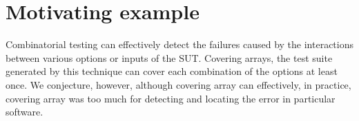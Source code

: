 \documentclass{sig-alternate}
\begin{document}
%
%
%
%
%



%
%

\section{Motivating example}
Combinatorial testing can effectively detect the failures caused by the interactions between various options or inputs of the SUT. Covering arrays, the test suite generated by this technique can cover each combination of the options at least once. We conjecture, however, although covering array can effectively, in practice, covering array was too much for detecting and locating the error in particular software.
\end{document}
